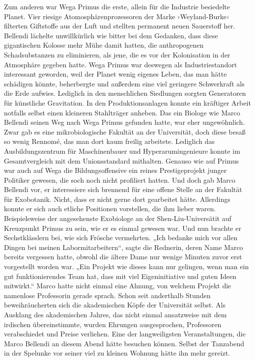 Zum anderen war Wega Primus die erste, allein für die Industrie besiedelte Planet. Vier riesige Atomosphärenprozessoren der Marke ›Weyland-Burke‹ filterten Giftstoffe aus der Luft und stellten permanent neuen Sauerstoff her. Bellendi lächelte unwillkürlich wie bitter bei dem Gedanken, dass diese gigantischen Kolosse mehr Mühe damit hatten, die anthropogenen Schadsubstanzen zu eliminieren, als jene, die es vor der Kolonisation in der Atmosphäre gegeben hatte.
Wega Primus war deswegen als Industriestandort interessant geworden, weil der Planet wenig eigenes Leben, das man hätte schädigen könnte, beherbergte und außerdem eine viel geringere Schwerkraft als die Erde aufwies. Lediglich in den menschlichen Siedlungen sorgten Generatoren für künstliche Gravitation. In den Produktionsanlagen konnte ein kräftiger Arbeit notfalls selbst einen kleineren Stahlträger anheben.
Das ein Biologe wie Marco Bellendi seinen Weg nach Wega Primus gefunden hatte, war eher ungewöhnlich. Zwar gab es eine mikrobiologische Fakultät an der Universität, doch diese besaß so wenig Rennomé, das man dort kaum freilig arbeitete. Lediglich das Ausbildungszentrum für Maschinenbauer und Hyperarumingenieure konnte im Gesamtvergleich mit dem Unionsstandard mithalten. Genauso wie auf Primus war auch auf Wega die Bildungsoffensive ein reines Prestigeprojekt junger Politiker gewesen, die soch noch nicht profiliert hatten.
Und doch gab Marco Bellendi vor, er interessiere sich brennend für eine offene Stelle an der Fakultät für Exobotanik. Nicht, dass er nicht gerne dort gearbeitet hätte. Allerdings konnte er sich auch etliche Positionen vorstellen, die ihm lieber waren. Beispielsweise der angesehenste Exobiologe an der Shen-Liu-Universätit auf Kreuzpunkt Primus zu sein, wie er es einmal gewesen war. Und nun brachte er Sechstklässlern bei, wie sich Frösche vermehrten.
„Ich bedanke mich vor allen Dingen bei meinen Labormitarbeitern“, sagte die Rednerin, deren Name Marco bereits vergessen hatte, obwohl die ältere Dame nur wenige Minuten zuvor erst vorgestellt worden war. „Ein Projekt wie dieses kann nur gelingen, wenn man ein gut funktionierendes Team hat, dass mit viel Eigeninitiative und guten Ideen mitwirkt.“
Marco hatte nicht einmal eine Ahnung, von welchem Projekt die namenlose Professorin gerade sprach. Schon seit anderthalb Stunden beweihräucherten sich die akademischen Köpfe der Universität selbst. Als Ausklang des akademischen Jahres, das nicht einmal ansatzweise mit dem irdischen übereinstimmte, wurden Ehrungen ausgesprochen, Professoren verabschiedet und Preise verliehen. Eine der langweiligsten Veranstaltungen, die Marco Bellendi an diesem Abend hätte besuchen können. Selbst der Tanzabend in der Spelunke vor seiner viel zu kleinen Wohnung hätte ihn mehr gereizt.
